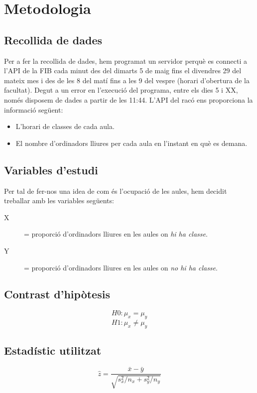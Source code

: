 \section{Metodologia}

\subsection{Recollida de dades}
Per a fer la recollida de dades, hem programat un servidor perquè es connecti a l'API de la FIB cada minut des del dimarts 5 de maig fins el divendres 29 del mateix mes i des de les 8 del matí fins a les 9 del vespre (horari d'obertura de la facultat). Degut a un error en l'execució del programa, entre els dies 5 i XX, només disposem de dades a partir de les  11:44.
L'API del racó ens proporciona la informació següent:
\begin{itemize}
	\item L'horari de classes de cada aula.
	\item El nombre d'ordinadors lliures per cada aula en l'instant en què es demana.
\end{itemize}

\subsection{Variables d'estudi}
Per tal de fer-nos una idea de com és l'ocupació de les aules, hem decidit treballar amb les variables següents:
\begin{description}
	\item[X] = proporció d'ordinadors lliures en les aules on \emph{hi ha classe}.
	\item[Y] = proporció d'ordinadors lliures en les aules on \emph{no hi ha classe}.
\end{description}

 
\subsection{Contrast d'hipòtesis}
$$H0: \mu_x = \mu_y$$
$$H1: \mu_x \neq \mu_y$$

\subsection{Estadístic utilitzat}
$$\hat{z} = \frac{\bar{x} - \bar{y}}{\sqrt{s_x^2/n_x + s_y^2/n_y}} $$



